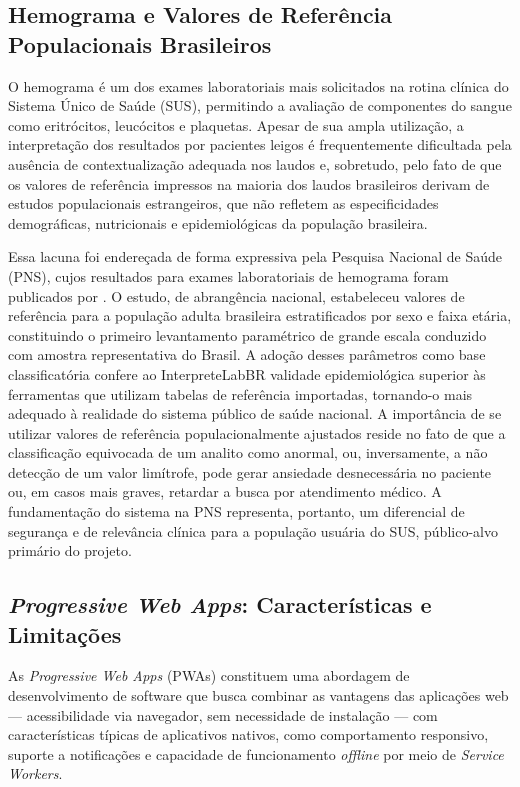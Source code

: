 \documentclass[12pt]{article}
\begin{document}
\subsection{Hemograma e Valores de Referência Populacionais Brasileiros}

O hemograma é um dos exames laboratoriais mais solicitados na rotina
clínica do Sistema Único de Saúde (SUS), permitindo a avaliação de
componentes do sangue como eritrócitos, leucócitos e plaquetas. Apesar
de sua ampla utilização, a interpretação dos resultados por pacientes
leigos é frequentemente dificultada pela ausência de contextualização
adequada nos laudos e, sobretudo, pelo fato de que os valores de referência
impressos na maioria dos laudos brasileiros derivam de estudos populacionais
estrangeiros, que não refletem as especificidades demográficas, nutricionais
e epidemiológicas da população brasileira.

Essa lacuna foi endereçada de forma expressiva pela Pesquisa Nacional de
Saúde (PNS), cujos resultados para exames laboratoriais de hemograma foram
publicados por \cite{rosenfeld2019}. O estudo, de abrangência nacional,
estabeleceu valores de referência para a população adulta brasileira
estratificados por sexo e faixa etária, constituindo o primeiro
levantamento paramétrico de grande escala conduzido com amostra
representativa do Brasil. A adoção desses parâmetros como base
classificatória confere ao InterpreteLabBR validade epidemiológica superior
às ferramentas que utilizam tabelas de referência importadas, tornando-o
mais adequado à realidade do sistema público de saúde nacional. A
importância de se utilizar valores de referência populacionalmente ajustados
reside no fato de que a classificação equivocada de um analito como anormal,
ou, inversamente, a não detecção de um valor limítrofe, pode gerar ansiedade
desnecessária no paciente ou, em casos mais graves, retardar a busca por
atendimento médico. A fundamentação do sistema na PNS representa, portanto,
um diferencial de segurança e de relevância clínica para a população usuária
do SUS, público-alvo primário do projeto.

\subsection{\textit{Progressive Web Apps}: Características e Limitações}

As \textit{Progressive Web Apps} (PWAs) constituem uma abordagem de
desenvolvimento de software que busca combinar as vantagens das aplicações
web — acessibilidade via navegador, sem necessidade de instalação — com
características típicas de aplicativos nativos, como comportamento
responsivo, suporte a notificações e capacidade de funcionamento
\textit{offline} por meio de \textit{Service Workers}.
\end{document}
